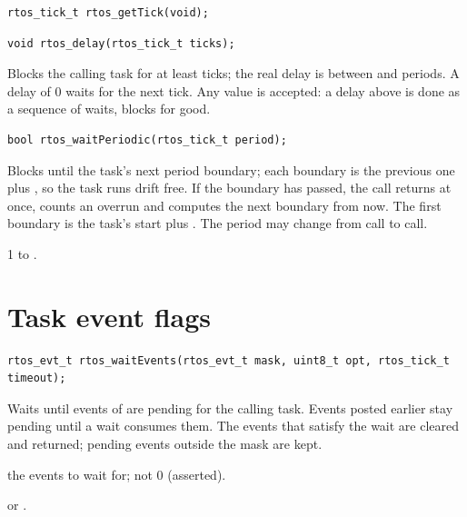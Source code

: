 \begin{lstlisting}
rtos_tick_t rtos_getTick(void);
\end{lstlisting}

\begin{lstlisting}
void rtos_delay(rtos_tick_t ticks);
\end{lstlisting}
Blocks the calling task for at least  ticks; the real delay is between
 and  periods. A delay of 0 waits for the next tick. Any
value is accepted: a delay above  is done as a sequence of
waits,  blocks for good.

\begin{lstlisting}
bool rtos_waitPeriodic(rtos_tick_t period);
\end{lstlisting}
Blocks until the task's next period boundary; each boundary is the previous one plus
, so the task runs drift free. If the boundary has passed, the call returns
at once, counts an overrun and computes the next boundary from now. The first boundary
is the task's start plus . The period may change from call to call.
\begin{apiparams}
\item[period] 1 to .
\end{apiparams}

\section{Task event flags}

\begin{lstlisting}
rtos_evt_t rtos_waitEvents(rtos_evt_t mask, uint8_t opt, rtos_tick_t timeout);
\end{lstlisting}
Waits until events of  are pending for the calling task. Events posted
earlier stay pending until a wait consumes them. The events that satisfy the wait are
cleared and returned; pending events outside the mask are kept.
\begin{apiparams}
\item[mask] the events to wait for; not 0 (asserted).
\item[opt]  or .
\end{apiparams}


